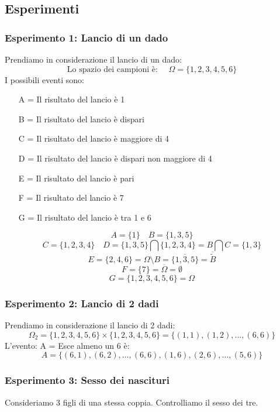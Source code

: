 \documentclass[a4paper]{article}
\theoremstyle{break}
\theoremstyle{break}
\theoremstyle{break}
\theoremstyle{break}
\begin{document}
\subsection{Esperimenti}
\subsubsection{Esperimento 1: Lancio di un dado}
Prendiamo in considerazione il lancio di un dado:
\[
	\text{Lo spazio dei campioni è: } \quad \Omega = \{1, 2, 3, 4, 5, 6\}
\]
I possibili eventi sono:
\begin{enumerate}
	\item[A =] Il risultato del lancio è 1
	\item[B =] Il risultato del lancio è dispari
	\item[C =] Il risultato del lancio è maggiore di 4
	\item[D =] Il risultato del lancio è dispari non maggiore di 4
	\item[E =] Il risultato del lancio è pari
	\item[F =] Il risultato del lancio è 7
	\item[G =] Il risultato del lancio è tra 1 e 6
\end{enumerate}
\[
	A = \{1\} \quad B = \{1, 3, 5\}
\]
\[
	C = \{1, 2, 3, 4\} \quad D = \{1, 3, 5\} \bigcap \{1, 2, 3, 4\} = B \bigcap C = \{1,3\}
\]
\[
	E = \{2, 4, 6\} = \Omega \setminus B = \overline{\{1, 3, 5\} } = \overline{\tilde{B}}
\]
\[
	F = \{7\} = \overline{\Omega} = \emptyset
\]
\[
	G = \{1, 2, 3, 4, 5, 6\} = \Omega
\]

\subsubsection{Esperimento 2: Lancio di 2 dadi}
Prendiamo in considerazione il lancio di 2 dadi:
\[
	\Omega_2 = \{1, 2, 3, 4, 5, 6\} \times \{1, 2, 3, 4, 5, 6\} = \{(1,1), (1,2), \ldots, (6,6)\}
\]
L'evento: A = Esce almeno un 6 è:
\[
	A = \{(6,1), (6,2), \ldots, (6,6), (1,6), (2,6), \ldots, (5,6)\}
\]
\subsubsection{Esperimento 3: Sesso dei nascituri}
Consideriamo 3 figli di una stessa coppia. Controlliamo il sesso dei tre.
\end{document}
